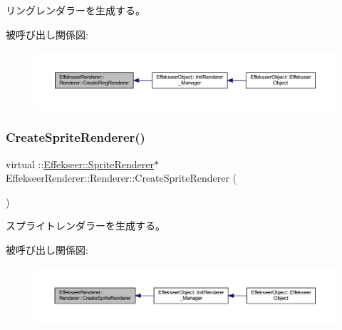 リングレンダラーを生成する。 

被呼び出し関係図\+:\nopagebreak
\begin{figure}[H]
\begin{center}
\leavevmode
\includegraphics[width=350pt]{class_effekseer_renderer_1_1_renderer_a84dec1c70cab5984ce151753b5c9bcb9_icgraph}
\end{center}
\end{figure}
\mbox{\label{class_effekseer_renderer_1_1_renderer_abecf62202fe3d54f4edf6c43d701188b}} 
\subsubsection{\texorpdfstring{Create\+Sprite\+Renderer()}{CreateSpriteRenderer()}}
{\footnotesize\ttfamily virtual \+::\mbox{\hyperlink{class_effekseer_1_1_sprite_renderer}{Effekseer\+::\+Sprite\+Renderer}}$\ast$ Effekseer\+Renderer\+::\+Renderer\+::\+Create\+Sprite\+Renderer (\begin{DoxyParamCaption}{ }\end{DoxyParamCaption})\hspace{0.3cm}{\ttfamily [pure virtual]}}



スプライトレンダラーを生成する。 

被呼び出し関係図\+:\nopagebreak
\begin{figure}[H]
\begin{center}
\leavevmode
\includegraphics[width=350pt]{class_effekseer_renderer_1_1_renderer_abecf62202fe3d54f4edf6c43d701188b_icgraph}
\end{center}
\end{figure}
\mbox{\label{class_effekseer_renderer_1_1_renderer_a13e29065eaca81d5191d9bad1421c408}} 
